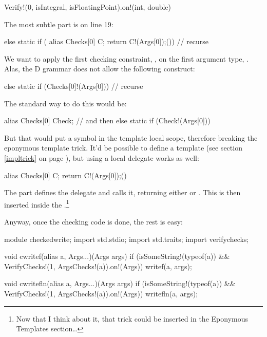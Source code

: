 \begin{dcode}
Verify!(0, isIntegral, isFloatingPoint).on!(int, double)
\end{dcode}

The most subtle part is on line 19: 

\begin{dcode}
else static if ({ alias Checks[0] C; return C!(Args[0]);}()) // recurse
\end{dcode}

We want to apply the first checking constraint, , on the first argument type, . Alas, the D grammar does not allow the following construct:

\begin{dcode}
else static if (Checks[0]!(Args[0])) // recurse
\end{dcode}

The standard way to do this would be:

\begin{dcode}
alias Checks[0] Check;
// and then
else static if (Check!(Args[0]))
\end{dcode}

But that would put a  symbol in the template local scope, therefore breaking the eponymous template trick. It'd be possible to define a  template (see section \ref{impltrick} on page \pageref{impltrick}), but using a local delegate works as well:

\begin{dcode}
{ alias Checks[0] C; return C!(Args[0]);}()
\end{dcode}

The  part defines the delegate and \DD{()} calls it, returning either  or . This is then inserted inside the .\footnote{ Now that I think about it, that trick could be inserted in the Eponymous Templates section\ldots}

Anyway, once the checking code is done, the rest is easy:

\begin{dcode}
module checkedwrite;
import std.stdio;
import std.traits;
import verifychecks;

void cwritef(alias a, Args...)(Args args) 
if (isSomeString!(typeof(a))
 && VerifyChecks!(1, ArgsChecks!(a)).on!(Args))
{
    writef(a, args);
}

void cwritefln(alias a, Args...)(Args args)
if (isSomeString!(typeof(a))
 && VerifyChecks!(1, ArgsChecks!(a)).on!(Args))
{
    writefln(a, args);
}
\end{dcode}

